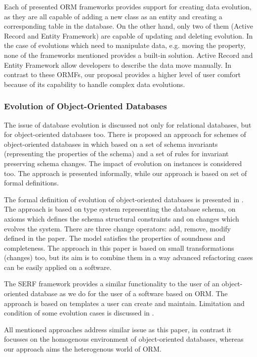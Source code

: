 \documentclass[11pt]{article}
\begin{document}
Each of presented ORM frameworks provides support for creating data evolution, as they are all capable of adding a new class as an entity and creating a corresponding table in the database. On the other hand, only two of them (Active Record and Entity Framework) are capable of updating and deleting evolution. In the case of evolutions which need to manipulate data, e.g. moving the property, none of the frameworks mentioned provides a built-in solution. Active Record and Entity Framework allow developers to describe the data move manually. In contrast to these ORMFs, our proposal  provides a higher level of user comfort because of its capability to handle complex data evolutions.

\subsubsection{Evolution of Object-Oriented Databases}
The issue of database evolution is discussed not only for relational databases, but for object-oriented databases too. There is proposed an approach for  schemes of object-oriented databases in \cite{Banerjee:SemanticsOfSchemaEvolutionInOODB} which based on a set of schema invariants (representing the properties of the schema) and a set of rules for invariant preserving schema changes. The impact of evolution on instances is considered too. The approach is presented informally, while our approach is based on set of formal definitions.

The formal definition of evolution of object-oriented databases is presented in \cite{Peters:AxiomaticModelOfDynamicEvolutionInOODB}. The approach is based on type system representing the database schema, on axioms which defines the schema structural constraints and on changes which evolves the system. There are three change operators: add, remove, modify defined in the paper. The model satisfies the properties of soundness and completeness. The approach in this paper is based on small transformations (changes) too, but its aim is to combine them in a way advanced refactoring cases can be easily applied on a software. 

The SERF framework \cite{Claypool:SERF} provides a similar functionality to the user of an object-oriented database as we do for the user of a software based on ORM. The approach is based on templates a user can create and maintain. Limitation and condition of some evolution cases is discussed in \cite{Claypool:SERF-formal}.

All mentioned approaches address similar  issue as this paper, in contrast it focusses on the homogenous environment of object-oriented databases, whereas our approach aims the heterogenous world of ORM.  
\end{document}
